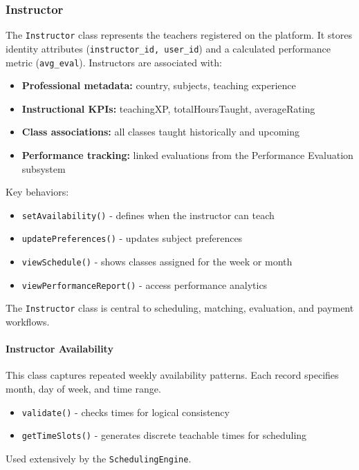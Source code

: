 \subsubsection{Instructor}
The \texttt{Instructor} class represents the teachers registered on the platform. It stores identity attributes (\texttt{instructor\_id, user\_id}) and a calculated performance metric (\texttt{avg\_eval}). Instructors are associated with:
\begin{itemize}
    \item \textbf{Professional metadata:} country, subjects, teaching experience
    \item \textbf{Instructional KPIs:} teachingXP, totalHoursTaught, averageRating
    \item \textbf{Class associations:} all classes taught historically and upcoming
    \item \textbf{Performance tracking:} linked evaluations from the Performance Evaluation subsystem
\end{itemize}
Key behaviors:
\begin{itemize}
    \item \texttt{setAvailability()} - defines when the instructor can teach
    \item \texttt{updatePreferences()} - updates subject preferences
    \item \texttt{viewSchedule()} - shows classes assigned for the week or month
    \item \texttt{viewPerformanceReport()} - access performance analytics
\end{itemize}
The \texttt{Instructor} class is central to scheduling, matching, evaluation, and payment workflows.

\paragraph{Instructor Availability}
This class captures repeated weekly availability patterns. Each record specifies month, day of week, and time range.
\begin{itemize}
    \item \texttt{validate()} - checks times for logical consistency
    \item \texttt{getTimeSlots()} - generates discrete teachable times for scheduling
\end{itemize}
Used extensively by the \texttt{SchedulingEngine}.


